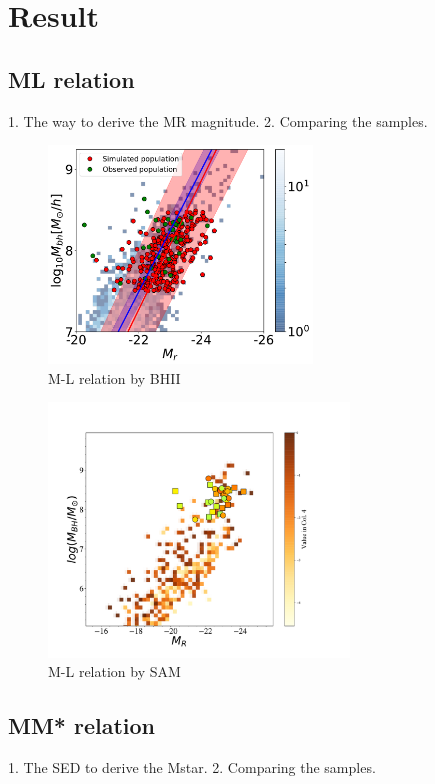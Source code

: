 \documentclass[twocolumn]{aastex62}
\begin{document}
\section{Result} 
\subsection{ML relation} 
1. The way to derive the MR magnitude.
2. Comparing the samples.

\begin{figure}[t]
\centering
\includegraphics[width =  7cm]{BHII_ML.pdf}
\caption{M-L relation by BHII }
\label{fig:BHII_ML}
\end{figure}

\begin{figure}[t]
\centering
\includegraphics[width =  8cm]{SAM_ML.pdf}
\caption{M-L relation by SAM}
\label{fig:SAM_ML}
\end{figure}

\subsection{MM* relation} 
1. The SED to derive the Mstar.
2. Comparing the samples.
\end{document}
